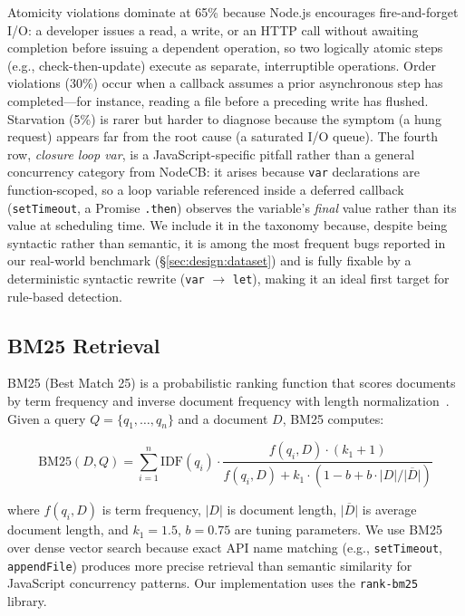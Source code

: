 \documentclass[runningheads]{llncs}
\begin{document}
Atomicity violations dominate at 65\% because Node.js encourages
fire-and-forget I/O: a developer issues a read, a write, or an HTTP call
without awaiting completion before issuing a dependent operation, so two
logically atomic steps (e.g., check-then-update) execute as separate,
interruptible operations.
Order violations (30\%) occur when a callback assumes a prior asynchronous
step has completed---for instance, reading a file before a preceding write
has flushed.
Starvation (5\%) is rarer but harder to diagnose because the symptom (a
hung request) appears far from the root cause (a saturated I/O queue).
The fourth row, \emph{closure loop var}, is a JavaScript-specific pitfall
rather than a general concurrency category from NodeCB: it arises because
\texttt{var} declarations are function-scoped, so a loop variable
referenced inside a deferred callback (\texttt{setTimeout}, a Promise
\texttt{.then}) observes the variable's \emph{final} value rather than its
value at scheduling time.
We include it in the taxonomy because, despite being syntactic rather
than semantic, it is among the most frequent bugs reported in our
real-world benchmark (\S\ref{sec:design:dataset}) and is fully fixable by
a deterministic syntactic rewrite (\texttt{var} $\to$ \texttt{let}),
making it an ideal first target for rule-based detection.

\subsection{BM25 Retrieval}
\label{sec:bg:bm25}

BM25 (Best Match 25) is a probabilistic ranking function that scores
documents by term frequency and inverse document frequency with length
normalization~\cite{bm25robertson}.
Given a query $Q = \{q_1, \ldots, q_n\}$ and a document $D$, BM25 computes:

\[
  \text{BM25}(D, Q) = \sum_{i=1}^{n} \text{IDF}(q_i) \cdot
  \frac{f(q_i, D) \cdot (k_1 + 1)}{f(q_i, D) + k_1 \cdot (1 - b + b \cdot |D| / \overline{|D|})}
\]

where $f(q_i, D)$ is term frequency, $|D|$ is document length,
$\overline{|D|}$ is average document length, and $k_1 = 1.5$, $b = 0.75$
are tuning parameters.
We use BM25 over dense vector search because exact API name matching
(e.g., \texttt{setTimeout}, \texttt{appendFile}) produces more precise
retrieval than semantic similarity for JavaScript concurrency patterns.
Our implementation uses the \texttt{rank-bm25}~\cite{rankbm25} library.
\end{document}
